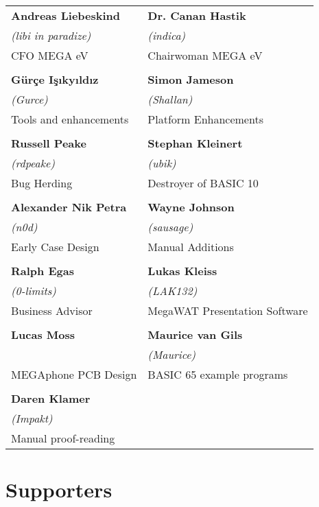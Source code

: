 \begin{tabular}{p{6cm}p{6cm}}

{\large\bf Andreas Liebeskind}     & {\large\bf Dr. Canan Hastik} \\
 \textit{(libi in paradize)}       & \textit{(indica)} \\
CFO MEGA eV                        & Chairwoman MEGA eV \\
& \\
{\large\bf Gürçe Işıkyıldız}       & {\large\bf Simon Jameson} \\
 \textit{(Gurce)}                  &  \textit{(Shallan)} \\
Tools and enhancements             & Platform Enhancements \\
& \\
{\large\bf Russell Peake}          & {\large\bf Stephan Kleinert} \\
  \textit{(rdpeake)}               & \textit{(ubik)}        \\
Bug Herding                        & Destroyer of BASIC 10     \\
& \\
{\large\bf Alexander Nik Petra}    & {\large\bf Wayne Johnson} \\
 \textit{(n0d)}                    &  \textit{(sausage)} \\
Early Case Design                  & Manual Additions \\
& \\
{\large\bf Ralph Egas}             & {\large\bf Lukas Kleiss} \\
 \textit{(0-limits)}               & \textit{(LAK132)} \\
Business Advisor                   & MegaWAT Presentation Software \\
& \\
{\large\bf Lucas Moss}             & {\large\bf Maurice van Gils }  \\
                                   & \textit{(Maurice)}  \\
MEGAphone PCB Design               & BASIC 65 example programs \\
& \\
{\large\bf Daren Klamer}           & \\
 \textit{(Impakt)}                 & \\
Manual proof-reading               & \\
\end{tabular}

\newpage
\section{Supporters}

